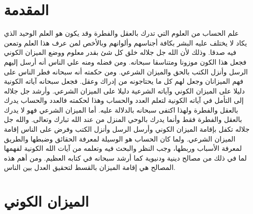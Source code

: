 \section{المقدمة}

علم الحساب من العلوم التي تدرك بالعقل والفطرة وقد يكون هو العلم الوحيد الذي يكاد لا يختلف عليه البشر بكافة أجناسهم وألوانهم وبالأخص لمن عرف هذا العلم وتمعن فيه صدقا. وذلك لأن الله جل جلاله خلق كل شئ بقدر معلوم ووضع الميزان الكوني فجعل هذا الكون موزونا ومتناسقا سبحانه. ومن فضله ومنه علي الناس أنه أرسل إليهم الرسل وأنزل الكتب بالحق والميزان الشرعي. ومن حكمته أنه سبحانه فطر الناس على فهم الميزانان وجعل لهم كل ما يحتاجونه من إدراك وعقل. فجعل سبحانه آياته الكونية دليلا على الميزان الكوني وآياته الشرعية دليلا على الميزان الشرعي. وأرشد جل جلاله إلى التأمل في آياته الكونية لتعلم العدد والحساب وهذا لحكمته فالعدد والحساب يدرك بالعقل والفطرة ولهذا اكتفى سبحانه بالدلالة عليه. أما الميزان الشرعي فهو لا يدرك بالعقل والفطرة فقط وأنما يدرك بالوحي المنزل من عند الله تبارك وتعالى. والله جل جلاله تكفل بإقامة الميزان الكوني وأرسل الرسل وأنزل الكتب وفرض على الناس إقامة الميزان الشرعي. ولما كان الحساب هو الوسيلة لمعرفة الحقائق وضبطها والطريق لمعرفة الأسباب وربطها، وجب النظر والبحث فيه وتعلمه من آيات الله الكونية لفهمها لما في ذلك من مصالح دينية ودنيوية كما أرشد سبحانه في  كتابه العظيم. ومن أهم هذه المصالح هي إقامة الميزان بالقسط لتحقيق العدل بين الناس. 

\section{الميزان الكوني}

